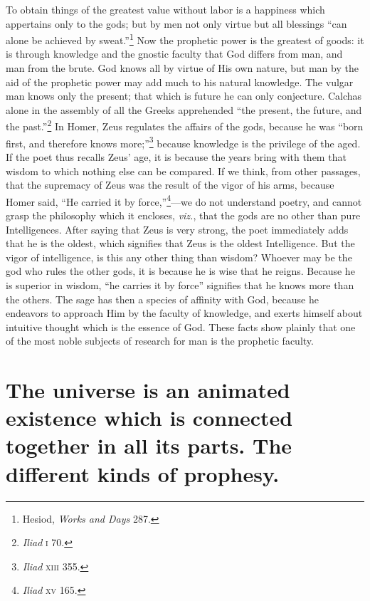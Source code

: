 \documentclass[12pt]{article}
\begin{document}
To obtain things of the greatest value without labor is a happiness which
appertains only to the gods; but by men not only virtue but all blessings ``can
alone be achieved by sweat.''\footnote{Hesiod, \textit{Works and Days} 287.}
Now the prophetic power is the greatest of goods: it is through knowledge and
the gnostic faculty that God differs from man, and man from the brute. God
knows all by virtue of His own nature, but man by the aid of the prophetic
power may add much to his natural knowledge. The vulgar man knows only the
present; that which is future he can only conjecture. Calchas alone in the
assembly of all the Greeks apprehended ``the present, the future, and the
past.''\footnote{\textit{Iliad} \textsc{i} 70.} In Homer, Zeus regulates the
affairs of the gods, because he was ``born first, and therefore knows
more;''\footnote{\textit{Iliad} \textsc{xiii} 355.} because knowledge is the
privilege of the aged. If the poet thus recalls Zeus' age, it is because the
years bring with them that wisdom to which nothing else can be compared. If we
think, from other passages, that the supremacy of Zeus was the result of the
vigor of his arms, because Homer said, ``He carried it by
force,''\footnote{\textit{Iliad} \textsc{xv} 165.}---we do not understand
poetry, and cannot grasp the philosophy which it encloses, \textit{viz.}, that
the gods are no other than pure Intelligences. After saying that Zeus is very
strong, the poet immediately adds that he is the oldest, which signifies that
Zeus is the oldest Intelligence. But the vigor of intelligence, is this any
other thing than wisdom? Whoever may be the god who rules the other gods, it is
because he is wise that he reigns. Because he is superior in wisdom, ``he
carries it by force'' signifies that he knows more than the others. The sage
has then a species of affinity with God, because he endeavors to approach Him
by the faculty of knowledge, and exerts himself about intuitive thought which
is the essence of God. These facts show plainly that one of the most noble
subjects of research for man is the prophetic faculty.


\section{The universe is an animated existence which is connected together in
all its parts. The different kinds of prophesy.}
\end{document}
